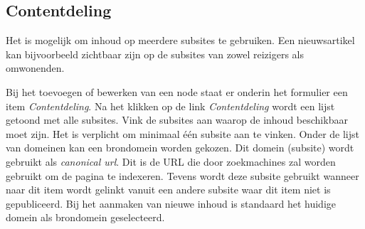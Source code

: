 \subsection{Contentdeling}\label{contentdeling}
Het is mogelijk om inhoud op meerdere subsites te gebruiken. Een nieuwsartikel kan bijvoorbeeld zichtbaar zijn op de subsites van zowel reizigers als omwonenden.

Bij het toevoegen of bewerken van een node staat er onderin het formulier een item \emph{Contentdeling}. Na het klikken op de link \emph{Contentdeling} wordt een lijst getoond met alle subsites. Vink de subsites aan waarop de inhoud beschikbaar moet zijn. Het is verplicht om minimaal \'{e}\'{e}n subsite aan te vinken. Onder de lijst van domeinen kan een brondomein worden gekozen. Dit domein (subsite) wordt gebruikt als \emph{canonical url}. Dit is de URL die door zoekmachines zal worden gebruikt om de pagina te indexeren. Tevens wordt deze subsite gebruikt wanneer naar dit item wordt gelinkt vanuit een andere subsite waar dit item niet is gepubliceerd. Bij het aanmaken van nieuwe inhoud is standaard het huidige domein als brondomein geselecteerd.
